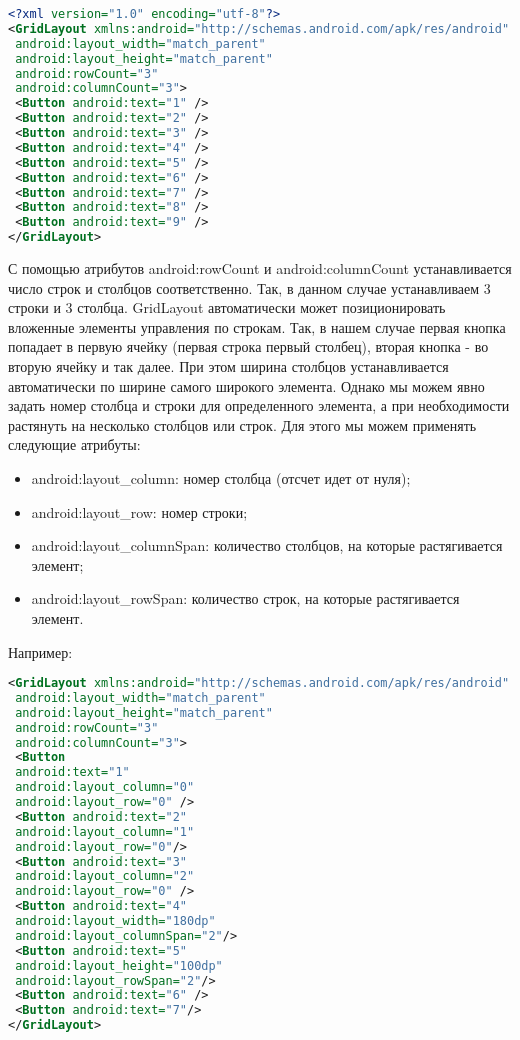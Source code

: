 \begin{lstlisting}[language=xml, caption=\leftline{xml}, label=lst:GridLayout]
<?xml version="1.0" encoding="utf-8"?>
<GridLayout xmlns:android="http://schemas.android.com/apk/res/android"
 android:layout_width="match_parent"
 android:layout_height="match_parent"
 android:rowCount="3"
 android:columnCount="3">
 <Button android:text="1" />
 <Button android:text="2" />
 <Button android:text="3" />
 <Button android:text="4" />
 <Button android:text="5" />
 <Button android:text="6" />
 <Button android:text="7" />
 <Button android:text="8" />
 <Button android:text="9" />
</GridLayout>
\end{lstlisting}
С помощью атрибутов android:rowCount и android:columnCount
устанавливается число строк и столбцов соответственно. Так, в данном
случае устанавливаем 3 строки и 3 столбца. GridLayout автоматически может
позиционировать вложенные элементы управления по строкам. Так, в нашем
случае первая кнопка попадает в первую ячейку (первая строка первый
столбец), вторая кнопка - во вторую ячейку и так далее.
При этом ширина столбцов устанавливается автоматически по ширине
самого широкого элемента.
Однако мы можем явно задать номер столбца и строки для определенного
элемента, а при необходимости растянуть на несколько столбцов или строк.
Для этого мы можем применять следующие атрибуты:
\begin{itemize}
    \item android:layout\_column: номер столбца (отсчет идет от нуля);
    \item android:layout\_row: номер строки;
    \item android:layout\_columnSpan: количество столбцов, на которые
    растягивается элемент;
    \item android:layout\_rowSpan: количество строк, на которые растягивается
    элемент.
\end{itemize}
Например:
\begin{lstlisting}[language=xml, caption=\leftline{xml}, label=lst:GridLayoutAtr]
    <GridLayout xmlns:android="http://schemas.android.com/apk/res/android"
 android:layout_width="match_parent"
 android:layout_height="match_parent"
 android:rowCount="3"
 android:columnCount="3">
 <Button
 android:text="1"
 android:layout_column="0"
 android:layout_row="0" />
 <Button android:text="2"
 android:layout_column="1"
 android:layout_row="0"/>
 <Button android:text="3"
 android:layout_column="2"
 android:layout_row="0" />
 <Button android:text="4"
 android:layout_width="180dp"
 android:layout_columnSpan="2"/>
 <Button android:text="5"
 android:layout_height="100dp"
 android:layout_rowSpan="2"/>
 <Button android:text="6" />
 <Button android:text="7"/>
</GridLayout>
\end{lstlisting}
